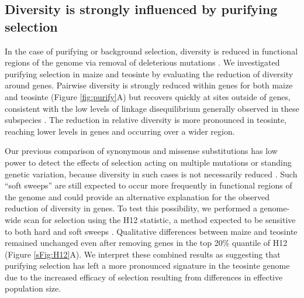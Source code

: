 \documentclass{pnastwo}
\newcommand{\mbh}[1]{\textcolor{blue}{\scriptsize #1}}
\begin{document}
\begin{article}
\subsection{Diversity is strongly influenced by purifying selection} %

In the case of purifying or background selection, diversity is reduced in functional regions of the genome via removal of deleterious mutations \cite{charlesworth1993}.
We investigated purifying selection in maize and teosinte by evaluating the reduction of diversity around genes.
Pairwise diversity is strongly reduced within genes for both maize and teosinte (Figure \ref{fig:purify}A) but recovers quickly at sites outside of genes, consistent with the low levels of linkage disequilibrium generally observed in these subspecies \cite{tenaillon2002,chia2012}. 
The reduction in relative diversity is more pronounced in teosinte, reaching lower levels in genes and occurring over a wider region.  

Our previous comparison of synonymous and missense substitutions has low power to detect the effects of selection acting on multiple mutations or standing genetic variation, because diversity in such cases  is not necessarily reduced \cite{innan2004,messer2013}. 
Such ``soft sweeps'' are still expected to occur more frequently in functional regions of the genome and could provide an alternative explanation for the observed reduction of diversity in genes. 
To test this possibility, we performed a genome-wide scan for selection using the H12 statistic, a method expected to be sensitive to both hard and soft sweeps \cite{garud2015}. 
Qualitative differences between maize and teosinte remained unchanged even after removing genes in the top 20\% quantile of H12 (Figure \ref{sFig:H12}A).
We interpret these combined results as suggesting that purifying selection has left a more pronounced signature in the teosinte genome due to the increased efficacy of selection resulting from differences in effective population size.


\end{article}
\end{document}
